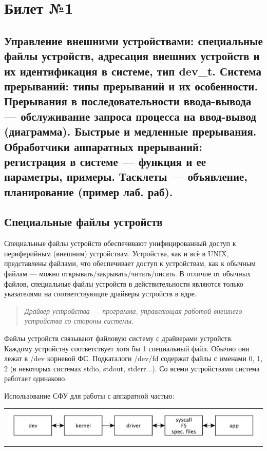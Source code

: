 \chapter{Билет №1}

\section*{Управление внешними устройствами: специальные файлы устройств, адресация внешних устройств и их идентификация в системе, тип dev\_t. Система прерываний: типы прерываний и их особенности. Прерывания в последовательности ввода-вывода --- обслуживание запроса процесса на ввод-вывод (диаграмма). Быстрые и медленные прерывания. Обработчики аппаратных прерываний: регистрация в системе --- функция и ее параметры, примеры. Тасклеты --- объявление, планирование (пример лаб. раб).}

\section{Специальные файлы устройств}
Специальные файлы устройств обеспечивают унифицированный доступ к периферийным (внешним) устройствам. Устройства, как и всё в UNIX, представлены файлами, что обеспечивает доступ к устройствам, как к обычным файлам --- можно открывать/закрывать/читать/писать. В отличие от обычных файлов, специальные файлы устройств в действительности являются только указателями на соответствующие драйверы устройств в ядре.

\begin{quote}
	\textit{Драйвер устройства --- программа, управляющая работой внешнего устройства со стороны системы.}
\end{quote}

 Файлы устройств связывают файловую систему с драйверами устройств. Каждому устройству соответствует хотя бы 1 специальный файл. Обычно они лежат в /dev корневой ФС. Подкаталоги /dev/fd содержат файлы с именами 0, 1, 2 (в некоторых системах stdio, stdout, stderr...). Со всеми устройствами система работает одинаково.

Использование СФУ для работы с аппаратной частью:

\begin{table}[h!]
  \centering
  \begin{tabular}{p{1\linewidth}}
    \centering
    \includegraphics[width=1\linewidth]{./images/spec_files.pdf}
  \end{tabular}
\end{table}

